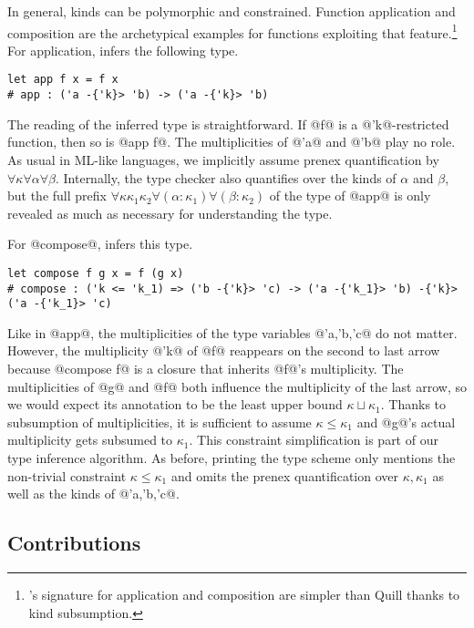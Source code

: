 In general, kinds can be polymorphic and constrained. Function
application and composition are the archetypical
examples for functions exploiting that feature.\footnote{\lang{}'s signature
  for application and composition are simpler than
  Quill \cite{DBLP:conf/icfp/Morris16} thanks to kind subsumption.}
For application, \lang{} infers the following type.
\begin{lstlisting}[numbers=none]
let app f x = f x
# app : ('a -{'k}> 'b) -> ('a -{'k}> 'b)
\end{lstlisting}
The reading of the inferred type is straightforward. If
@f@ is a @'k@-restricted function, then so is
@app f@. The multiplicities of @'a@ and
@'b@ play no role. As usual in ML-like languages, we
implicitly assume prenex quantification by
$\forall\kappa\forall\alpha\forall\beta$. Internally, the
type checker also quantifies over the kinds of $\alpha$ and $\beta$,
but the full prefix
$\forall\kappa\kappa_1\kappa_2\forall(\alpha:\kappa_1)\forall(\beta:\kappa_2)$
of the type of @app@ is only revealed as much as necessary for
understanding the type.

For @compose@, \lang{} infers this type.
\begin{lstlisting}[numbers=none]
let compose f g x = f (g x)
# compose : ('k <= 'k_1) => ('b -{'k}> 'c) -> ('a -{'k_1}> 'b) -{'k}> ('a -{'k_1}> 'c)
\end{lstlisting}
Like in @app@, the multiplicities of the type variables
@'a,'b,'c@ do not matter. However, the multiplicity
@'k@ of @f@ reappears on the second to last arrow
because @compose f@ is a closure that inherits
@f@'s multiplicity. The multiplicities of @g@  and
@f@ both influence the multiplicity of the last arrow, so
we would expect its annotation to be the least upper bound
$\kappa \sqcup \kappa_1$. Thanks to subsumption of multiplicities, it
is sufficient to assume $\kappa \le \kappa_1$ and @g@'s
actual multiplicity gets subsumed to $\kappa_1$. This constraint
simplification is part of our type inference algorithm. As before,
printing the type scheme only mentions the non-trivial constraint
$\kappa\le\kappa_1$ and omits the prenex quantification over $\kappa,
\kappa_1$ as well as the kinds of @'a,'b,'c@.

\lstDeleteShortInline@

\subsection{Contributions}
\label{sec:contributions}

